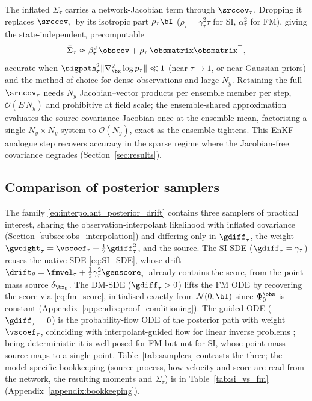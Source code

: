 The inflated $\bar\Sigma_\tau$ carries a network-Jacobian term through $\srccov_\tau$. Dropping it replaces $\srccov_\tau$ by its isotropic part $\rho_\tau\bI$ ($\rho_\tau=\gamma_\tau^2\tau$ for SI, $\alpha_\tau^2$ for FM), giving the state-independent, precomputable
\begin{align}\label{eq:cov_cheap}
    \bar{\Sigma}_\tau \approx \beta_\tau^2\,\obscov + \rho_\tau\,\obsmatrix\obsmatrix^\top,
\end{align}
accurate when $\sigpath_\tau^2\|\nabla_{\bx}^2\log p_\tau\|\ll1$ (near $\tau\to1$, or near-Gaussian priors) and the method of choice for dense observations and large $N_y$. Retaining the full $\srccov_\tau$ needs $N_y$ Jacobian--vector products per ensemble member per step, $\mathcal{O}(E\,N_y)$ and prohibitive at field scale; the ensemble-shared approximation evaluates the source-covariance Jacobian once at the ensemble mean, factorising a single $N_y\times N_y$ system to $\mathcal{O}(N_y)$, exact as the ensemble tightens. This EnKF-analogue step recovers accuracy in the sparse regime where the Jacobian-free covariance degrades (Section~\ref{sec:results}).



\subsection{Comparison of posterior samplers}
\label{subsec:summary_table}\label{subsec:supplying_diffusion}

The family \eqref{eq:interpolant_posterior_drift} contains three samplers of practical interest, sharing the observation-interpolant likelihood with inflated covariance (Section~\ref{subsec:obs_interpolation}) and differing only in $\gdiff_\tau$, the weight $\gweight_\tau=\vscoef_\tau+\tfrac12\gdiff_\tau^2$, and the source. The SI-SDE ($\gdiff_\tau=\gamma_\tau$) reuses the native SDE \eqref{eq:SI_SDE}, whose drift $\drift_\theta=\fmvel_\tau+\tfrac12\gamma_\tau^2\genscore_\tau$ already contains the score, from the point-mass source $\delta_{\bx_0}$. The DM-SDE ($\gdiff_\tau>0$) lifts the FM ODE by recovering the score via \eqref{eq:fm_score}, initialised exactly from $\mathcal{N}(0,\bI)$ since $\Phi_0^{\obs}$ is constant (Appendix~\ref{appendix:proof_conditioning}). The guided ODE ($\gdiff_\tau=0$) is the probability-flow ODE of the posterior path with weight $\vscoef_\tau$, coinciding with interpolant-guided flow for linear inverse problems \cite{yan_fig_2024, pokle_training-free_2024}; being deterministic it is well posed for FM but not for SI, whose point-mass source maps to a single point. Table~\ref{tab:samplers} contrasts the three; the model-specific bookkeeping (source process, how velocity and score are read from the network, the resulting moments and $\bar\Sigma_\tau$) is in Table~\ref{tab:si_vs_fm} (Appendix~\ref{appendix:bookkeeping}).

